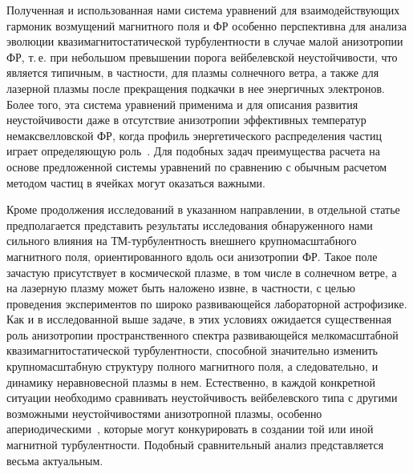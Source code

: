Полученная и использованная нами система уравнений для взаимодействующих гармоник возмущений магнитного поля и ФР особенно перспективна для анализа эволюции квазимагнитостатической турбулентности в случае малой анизотропии ФР, т.\,е. при небольшом превышении порога вейбелевской неустойчивости, что является типичным, в частности, для плазмы солнечного ветра, а также для лазерной плазмы после прекращения подкачки в нее энергичных электронов. Более того, эта система уравнений применима и для описания развития неустойчивости даже в отсутствие анизотропии эффективных температур немаксвелловской ФР, когда профиль энергетического распределения частиц играет определяющую роль~\cite{Silva2021,Lazar2010}. Для подобных задач преимущества расчета на основе предложенной системы уравнений по сравнению с обычным расчетом методом частиц в ячейках могут оказаться важными.

Кроме продолжения исследований в указанном направлении, в отдельной статье предполагается представить результаты исследования обнаруженного нами сильного влияния на ТМ-турбулентность внешнего крупномасштабного магнитного поля, ориентированного вдоль оси анизотропии ФР. Такое поле зачастую присутствует в космической плазме, в том числе в солнечном ветре, а на лазерную плазму может быть наложено извне, в частности, с целью проведения экспериментов по широко развивающейся лабораторной астрофизике. Как и в исследованной выше задаче, в этих условиях ожидается существенная роль анизотропии пространственного спектра развивающейся мелкомасштабной квазимагнитостатической турбулентности, способной значительно изменить крупномасштабную структуру полного магнитного поля, а следовательно, и динамику неравновесной плазмы в нем. Естественно, в каждой конкретной ситуации необходимо сравнивать неустойчивость вейбелевского типа с другими возможными неустойчивостями анизотропной плазмы, особенно апериодическими~\cite{Lazar2022,Shaaban2021,Shaaban2019,Yoon2017,Dieckmann2019,StockemNovo2015}, которые могут конкурировать в создании той или иной магнитной турбулентности. Подобный сравнительный анализ представляется весьма актуальным.
















